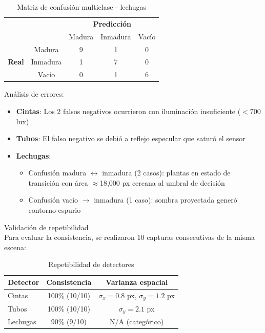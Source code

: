 \begin{table}[H]
\centering
\begin{tabular}{cc|c|c|c|}
\cline{3-5}
& & \multicolumn{3}{c|}{\textbf{Predicción}} \\ \cline{3-5}
& & Madura & Inmadura & Vacío \\ \hline
\multicolumn{1}{|c|}{\multirow{3}{*}{\textbf{Real}}} & Madura & 9 & 1 & 0 \\ \cline{2-5}
\multicolumn{1}{|c|}{} & Inmadura & 1 & 7 & 0 \\ \cline{2-5}
\multicolumn{1}{|c|}{} & Vacío & 0 & 1 & 6 \\ \hline
\end{tabular}
\caption{Matriz de confusión multiclase - lechugas}
\label{tab:confusion_lechugas}
\end{table}

\noindent
Análisis de errores:

\begin{itemize}[label=$\bullet$]
    \item \textbf{Cintas}: Los 2 falsos negativos ocurrieron con iluminación insuficiente ($<$700 lux)
    \item \textbf{Tubos}: El falso negativo se debió a reflejo especular que saturó el sensor
    \item \textbf{Lechugas}: 
    \begin{itemize}
        \item Confusión madura $\leftrightarrow$ inmadura (2 casos): plantas en estado de transición con área $\approx$18,000 px cercana al umbral de decisión
        \item Confusión vacío $\rightarrow$ inmadura (1 caso): sombra proyectada generó contorno espurio
    \end{itemize}
\end{itemize}

Validación de repetibilidad\\
\noindent
Para evaluar la consistencia, se realizaron 10 capturas consecutivas de la misma escena:

\begin{table}[H]
\centering
\begin{tabular}{|l|c|c|}
\hline
\textbf{Detector} & \textbf{Consistencia} & \textbf{Varianza espacial} \\ \hline
Cintas & 100\% (10/10) & $\sigma_x = 0.8$ px, $\sigma_y = 1.2$ px \\ \hline
Tubos & 100\% (10/10) & $\sigma_y = 2.1$ px \\ \hline
Lechugas & 90\% (9/10) & N/A (categórico) \\ \hline
\end{tabular}
\caption{Repetibilidad de detectores}
\label{tab:repetibilidad}
\end{table}

